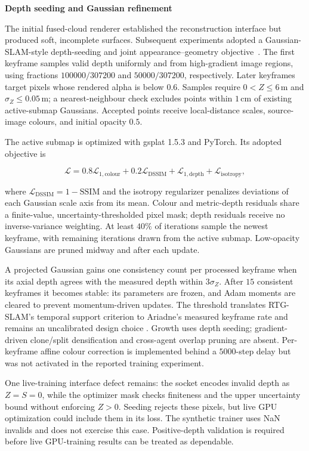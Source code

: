 \documentclass[10pt,a4paper]{article}
\newcommand{\indentedheading}[1]{\par\addvspace{0.65em}\noindent\hspace*{1em}\textbf{#1}\par\smallskip}
\begin{document}
\indentedheading{Depth seeding and Gaussian refinement}

The initial fused-cloud renderer established the reconstruction
interface but produced soft, incomplete surfaces. Subsequent
experiments adopted a Gaussian-SLAM-style depth-seeding and
joint appearance--geometry objective~\cite{gaussianslam}.
The first keyframe samples valid depth uniformly and from
high-gradient image regions, using fractions
$100000/307200$ and $50000/307200$, respectively.
Later keyframes target pixels whose rendered alpha is below
$0.6$. Samples require $0<Z\leq6$\,m and
$\sigma_Z\leq0.05$\,m; a nearest-neighbour check excludes
points within $1$\,cm of existing active-submap Gaussians.
Accepted points receive local-distance scales, source-image
colours, and initial opacity $0.5$.

The active submap is optimized with gsplat 1.5.3 and PyTorch.
Its adopted objective is

\begin{equation}
\mathcal{L}=
0.8\mathcal{L}_{1,\mathrm{colour}}
+0.2\mathcal{L}_{\mathrm{DSSIM}}
+\mathcal{L}_{1,\mathrm{depth}}
+\mathcal{L}_{\mathrm{isotropy}},
\label{eq:splat-loss}
\end{equation}

where $\mathcal{L}_{\mathrm{DSSIM}}=1-\mathrm{SSIM}$ and
the isotropy regularizer penalizes deviations of each Gaussian
scale axis from its mean. Colour and metric-depth residuals
share a finite-value, uncertainty-thresholded pixel mask;
depth residuals receive no inverse-variance weighting.
At least $40\%$ of iterations sample the newest keyframe,
with remaining iterations drawn from the active submap.
Low-opacity Gaussians are pruned midway and after each update.

A projected Gaussian gains one consistency count per processed
keyframe when its axial depth agrees with the measured depth
within $3\sigma_Z$. After $15$ consistent keyframes it becomes
stable: its parameters are frozen, and Adam moments are cleared
to prevent momentum-driven updates. The threshold translates
RTG-SLAM's temporal support criterion to Ariadne's measured
keyframe rate and remains an uncalibrated design choice
\cite{rtgslam}. Growth uses depth seeding; gradient-driven
clone/split densification and cross-agent overlap pruning
are absent. Per-keyframe affine colour correction is implemented
behind a $5000$-step delay but was not activated in the reported
training experiment.

One live-training interface defect remains: the socket encodes
invalid depth as $Z=S=0$, while the optimizer mask checks
finiteness and the upper uncertainty bound without enforcing
$Z>0$. Seeding rejects these pixels, but live GPU optimization
could include them in its loss. The synthetic trainer uses NaN
invalids and does not exercise this case. Positive-depth
validation is required before live GPU-training results can
be treated as dependable.
\end{document}
